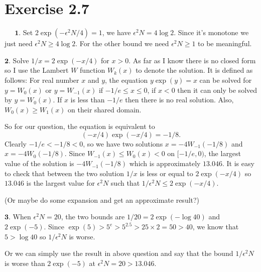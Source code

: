 \documentclass{article}
\begin{document}
\section*{Exercise 2.7}

$\quad\;\, \mathbf{1}$. Set $2\exp(-\epsilon^2 N/4) = 1$, we have $\epsilon^2 N = 4\log 2$. Since it's monotone we just need $\epsilon^2 N \geq 4\log 2$. For the other bound we need $\epsilon^2 N \geq 1$ to be meaningful.

$\mathbf{2}$. Solve $1/x = 2\exp(-x/4)$ for $x > 0$. As far as I know there is no closed form so I use the Lambert $W$ function $W_k(x)$ to denote the solution. It is defined as follows:
For real number $x$ and $y$, the equation $y\exp(y)=x$ can be solved for $y=W_0(x)$ or $y=W_{-1}(x)$ if $ -1/e \leq x\leq 0$, if $x < 0$ then it can only be solved by $y=W_0(x)$. If $x$ is less than $-1/e$ then there is no real solution. Also, $W_0(x) \geq W_1(x)$ on their shared domain.

So for our question, the equation is equivalent to 
\begin{equation}
    (-x/4)\exp(-x/4) = -1/8.
\end{equation}
Clearly $-1/e < -1/8 < 0$, so we have two solutions $x = -4W_{-1}(-1/8)$ and $x=-4 W_{0}(-1/8)$. Since $W_{-1}(x) \leq W_{0}(x) < 0$ on $[-1/e, 0)$, the largest value of the solution is $-4W_{-1}(-1/8)$ which is approximately $13.046$. It is easy to check that between the two solution $1/x$ is less or equal to $2\exp(-x/4)$ so $13.046$ is the largest value for $\epsilon^2 N$ such that $1/\epsilon^2 N \leq 2\exp(-x/4)$.

(Or maybe do some expansion and get an approximate result?)

$\mathbf{3}$. When $\epsilon^2 N = 20$, the two bounds are $1/20 = 2\exp(-\log40)$ and $2\exp(-5)$. Since $\exp(5) > 5^e > 5^{2.5} > 25 \times 2 = 50 > 40 $, we know that $5 > \log40$ so $1/\epsilon^2 N$ is worse.

Or we can simply use the result in above question and say that the bound $1/\epsilon^2 N$ is worse than $2\exp(-5)$ at $\epsilon^2 N =20 > 13.046$. 
\end{document}

